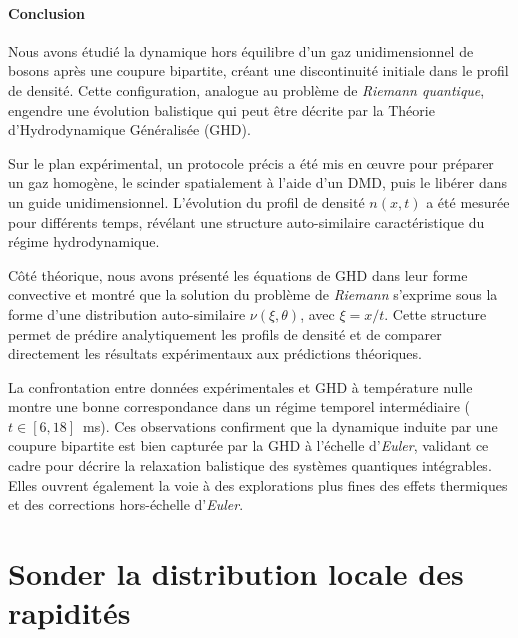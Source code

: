 \paragraph{Conclusion}

Nous avons étudié la dynamique hors équilibre d’un gaz unidimensionnel de bosons après une coupure bipartite, créant une discontinuité initiale dans le profil de densité. Cette configuration, analogue au problème de \emph{Riemann quantique}, engendre une évolution balistique qui peut être décrite par la Théorie d’Hydrodynamique Généralisée (\gls{GHD}).

\medskip

Sur le plan expérimental, un protocole précis a été mis en œuvre pour préparer un gaz homogène, le scinder spatialement à l’aide d’un \gls{DMD}, puis le libérer dans un guide unidimensionnel. L’évolution du profil de densité $n(x,t)$ a été mesurée pour différents temps, révélant une structure auto-similaire caractéristique du régime hydrodynamique.  

\medskip

Côté théorique, nous avons présenté les équations de \gls{GHD} dans leur forme convective et montré que la solution du problème de \emph{Riemann} s’exprime sous la forme d’une distribution auto-similaire $\nu(\xi, \theta)$, avec $\xi = x/t$. Cette structure permet de prédire analytiquement les profils de densité et de comparer directement les résultats expérimentaux aux prédictions théoriques.

\medskip

La confrontation entre données expérimentales et \gls{GHD} à température nulle montre une bonne correspondance dans un régime temporel intermédiaire ($t \in [6,18]$~ms). Ces observations confirment que la dynamique induite par une coupure bipartite est bien capturée par la \gls{GHD} à l’échelle d’\emph{Euler}, validant ce cadre pour décrire la relaxation balistique des systèmes quantiques intégrables. Elles ouvrent également la voie à des explorations plus fines des effets thermiques et des corrections hors-échelle d’\emph{Euler}.




\section{Sonder la distribution locale des rapidités}
\label{sec:local}

%


